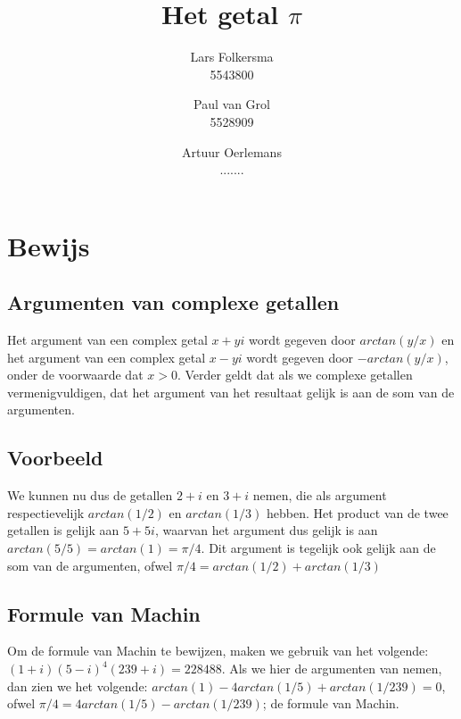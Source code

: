 \documentclass[10pt,a4paper]{article}
\title{Het getal $\pi$}
\author{
	Lars Folkersma\\
	5543800\\
	\and
	Paul van Grol \\
	5528909
	\and
	Artuur Oerlemans \\
	.......}
\begin{document}
\maketitle
\newpage

\section{Bewijs}
\subsection{Argumenten van complexe getallen}
Het argument van een complex getal $ x+yi $ wordt gegeven door $ arctan(y/x) $ en het argument van een complex getal $ x-yi $ wordt gegeven door $ -arctan(y/x) $, onder de voorwaarde dat $ x>0 $.
Verder geldt dat als we complexe getallen vermenigvuldigen, dat het argument van het resultaat gelijk is aan de som van de argumenten.
\subsection{Voorbeeld}
We kunnen nu dus de getallen $ 2+i $ en $ 3+i $ nemen, die als argument respectievelijk $ arctan(1/2) $ en $ arctan(1/3) $ hebben. Het product van de twee getallen is gelijk aan $ 5 + 5i $, waarvan het argument dus gelijk is aan $ arctan(5/5) = arctan(1) = \pi / 4 $. Dit argument is tegelijk ook gelijk aan de som van de argumenten, ofwel $ \pi / 4 = arctan(1/2)+arctan(1/3) $
\subsection{Formule van Machin}
Om de formule van Machin te bewijzen, maken we gebruik van het volgende:
$ (1+i) (5-i)^4 (239+i) = 228488 $. Als we hier de argumenten van nemen, dan zien we het volgende: $ arctan(1) - 4 arctan(1/5) + arctan(1/239) = 0 $, ofwel $ \pi/4 = 4 arctan(1/5) - arctan(1/239) $; de formule van Machin.
\end{document}
